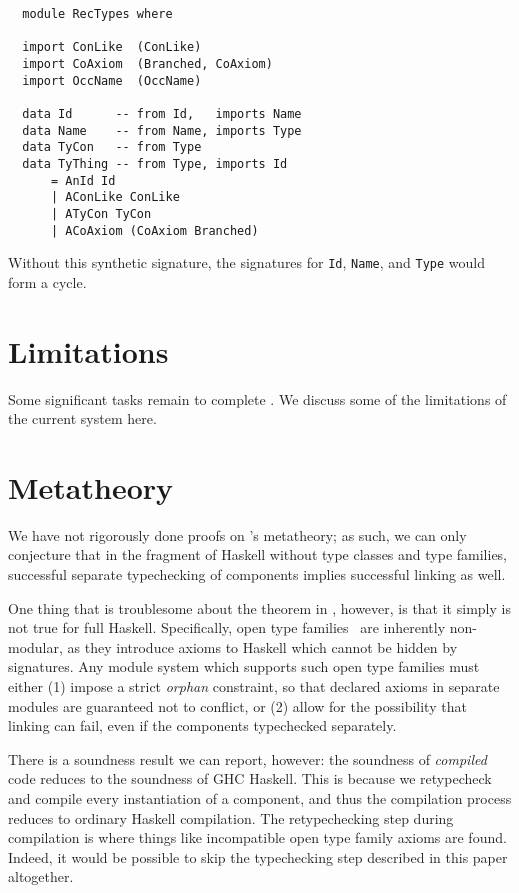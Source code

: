 \begin{verbatim}
  module RecTypes where

  import ConLike  (ConLike)
  import CoAxiom  (Branched, CoAxiom)
  import OccName  (OccName)

  data Id      -- from Id,   imports Name
  data Name    -- from Name, imports Type
  data TyCon   -- from Type
  data TyThing -- from Type, imports Id
      = AnId Id
      | AConLike ConLike
      | ATyCon TyCon
      | ACoAxiom (CoAxiom Branched)
\end{verbatim}
Without this synthetic signature, the signatures for \texttt{Id}, \texttt{Name},
and \texttt{Type} would form a cycle.

\section{Limitations}
\label{sec:limitations}

Some significant tasks remain to complete \Backpack{}.  We discuss
some of the limitations of the current system here.

\section{Metatheory}
\label{sec:metatheory}

We have not rigorously done proofs on \Backpack{}'s metatheory; as such, we can
only conjecture that in the fragment of Haskell without type classes
and type families, successful separate typechecking of components
implies successful linking as well.

One thing that is troublesome about the theorem in \OldBackpack{}, however,
is that it simply is not true for full Haskell.  Specifically,
open type families~\cite{schrijvers+:typefamilies} are inherently non-modular, as they
introduce axioms to Haskell which cannot be hidden by signatures.
Any module system which supports such open type families must either
(1) impose a strict \emph{orphan} constraint, so that declared axioms
in separate modules are guaranteed not to conflict, or (2) allow
for the possibility that linking can fail, even if the components
typechecked separately.

There is a soundness result we can report, however: the soundness of
\emph{compiled} \Backpack{} code reduces to the soundness of GHC
Haskell.  This is because we retypecheck and compile every instantiation
of a component, and thus the compilation process reduces to ordinary
Haskell compilation.  The retypechecking step during compilation is
where things like incompatible open type family axioms are found.
Indeed, it would be possible to skip the typechecking step described in
this paper altogether.

